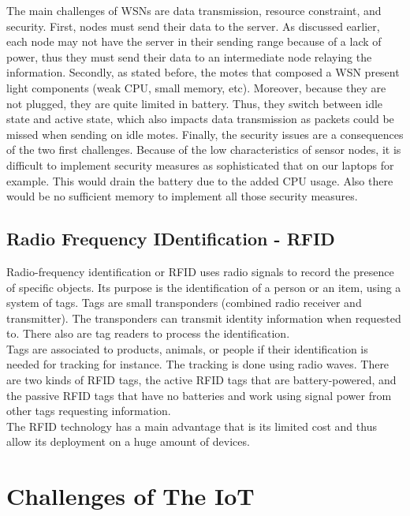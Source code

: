 The main challenges of WSNs are data transmission, resource constraint, and security. First, nodes must send their data to the server. As discussed earlier, each node may not have the server in their sending range because of a lack of power, thus they must send their data to an intermediate node relaying the information. Secondly, as stated before, the motes that composed a WSN present light components (weak CPU, small memory, etc). Moreover, because they are not plugged, they are quite limited in battery. Thus, they switch between idle state and active state, which also impacts data transmission as packets could be missed when sending on idle motes. Finally, the security issues are a consequences of the two first challenges. Because of the low characteristics of sensor nodes, it is difficult to implement security measures as sophisticated that on our laptops for example. This would drain the battery due to the added CPU usage. Also there would be no sufficient memory to implement all those security measures.\\

\subsection{Radio Frequency IDentification - RFID}

Radio-frequency identification or RFID uses radio signals to record the presence of specific objects. Its purpose is the identification of a person or an item, using a system of tags. Tags are small transponders (combined radio receiver and transmitter). The transponders can transmit identity information when requested to. There also are tag readers to process the identification.\\

Tags are associated to products, animals, or people if their identification is needed for tracking for instance. The tracking is done using radio waves. There are two kinds of RFID tags, the active RFID tags that are battery-powered, and the passive RFID tags that have no batteries and work using signal power from other tags requesting information.\\

The RFID technology has a main advantage that is its limited cost and thus allow its deployment on a huge amount of devices.
\section{Challenges of The IoT}

